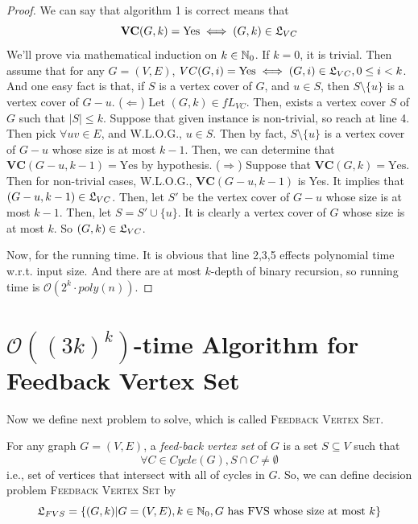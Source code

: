 \documentclass[12pt, a4paper, openany, twoside]{book}
\theoremstyle{definition}
\theoremstyle{remark}
\newcommand{\CO}{{\mathcal {O}}} \newcommand{\CP}{{\mathcal {P}}}
\theoremstyle{plain}
\numberwithin{equation}{section}
\begin{document}
\begin{proof}
    
We can say that algorithm 1 is correct means that 
\[\mathbf{VC}(G, k) = \text{Yes} \iff (G, k) \in {\mathfrak{L}}_{VC}\]
We'll prove via mathematical induction on $k \in {\mathbb {N}}_0$. If $k = 0$, it is trivial.
Then assume that for any $G = (V, E)$, $VC(G, i) = \text{Yes} \iff (G, i) \in {\mathfrak{L}}_{VC}, 0 \leq i < k$. 
And one easy fact is that, if $S$ is a vertex cover of $G$, and $u \in S$, then $S \setminus \{u\}$ is a vertex cover of $G - u$. 
($\Leftarrow$) Let $(G, k) \in fL_{VC}$. Then, exists a vertex cover $S$ of $G$ such that $|S| \leq k$. 
Suppose that given instance is non-trivial, so reach at line 4. Then pick $\forall uv \in E$, and W.L.O.G., $u \in S$. Then by fact, 
$S \setminus \{u\}$ is a vertex cover of $G - u$ whose size is at most $k - 1$. Then, we can determine that $\mathbf{VC}(G-u,k-1) = \text{Yes}$ by hypothesis. 
\newline
($\Rightarrow$) Suppose that $\textbf{VC}(G, k) = \text{Yes}$. Then for non-trivial cases, W.L.O.G.,
$\textbf{VC}(G-u, k-1)$ is Yes. It implies that $(G-u, k-1) \in {\mathfrak{L}}_{VC}$. Then, let $S'$ be the vertex cover of $G-u$ whose size is at most $k-1$. 
Then, let $S = S' \cup \{u\}$. It is clearly a vertex cover of $G$ whose size is at most $k$. So $(G, k) \in {\mathfrak{L}}_{VC}$. 

Now, for the running time. It is obvious that line 2,3,5 effects polynomial time w.r.t. input size. And there are at most $k$-depth of binary recursion, so 
running time is $\CO(2^k \cdot poly(n))$. 

\end{proof}

\section{$\CO((3k)^k)$-time Algorithm for Feedback Vertex Set}

Now we define next problem to solve, which is called \textsc{Feedback Vertex Set}. 

\begin{tcolorbox}[colback=yellow!10!white,colframe=red!75!black,title=\textsc{Feedback Vertex Set}]

For any graph $G = (V, E)$, a \textit{feed-back vertex set} of $G$ is a set $S \subseteq V$ such that 
\[\forall C \in Cycle(G), S \cap C \neq \emptyset\]
i.e., set of vertices that intersect with all of cycles in $G$. So, we can define decision problem \textsc{Feedback Vertex Set} by 
\[{\mathfrak{L}}_{FVS} = \{(G, k) | G = (V, E), k \in {\mathbb {N}}_0, G \text{ has FVS whose size at most $k$}\}\]

\end{tcolorbox}
\end{document}
